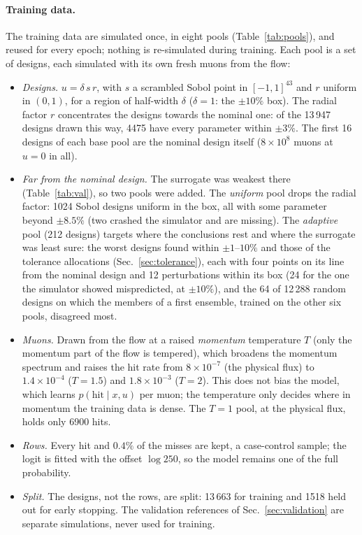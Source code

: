 \documentclass[11pt,a4paper]{article}
\begin{document}
\paragraph{Training data.}
The training data are simulated once, in eight pools (Table~\ref{tab:pools}), and reused for every
epoch; nothing is re-simulated during training. Each pool is a set of designs, each simulated
with its own fresh muons from the flow:
\begin{itemize}
  \item \emph{Designs.} $u=\delta\,s\,r$, with $s$ a scrambled Sobol point in $[-1,1]^{43}$ and
        $r$ uniform in $(0,1)$, for a region of half-width $\delta$ ($\delta=1$: the $\pm10\%$
        box). The radial factor $r$ concentrates the designs towards the nominal one: of the
        13\,947 designs drawn this way, 4475 have every parameter within $\pm3\%$. The
        first 16 designs of each base pool are the nominal design itself ($8\times10^8$ muons
        at $u=0$ in all).
  \item \emph{Far from the nominal design.} The surrogate was weakest there (Table~\ref{tab:val}),
        so two pools were added. The \emph{uniform} pool drops the radial factor: 1024 Sobol
        designs uniform in the box, all with some parameter beyond $\pm8.5\%$ (two crashed the
        simulator and are missing). The \emph{adaptive} pool (212 designs) targets where the
        conclusions rest and where the surrogate was least sure: the worst designs found within
        $\pm1$--$10\%$ and those of the tolerance allocations (Sec.~\ref{sec:tolerance}), each with
        four points on its line from the nominal design and 12 perturbations within its box (24
        for the one the simulator showed mispredicted, at $\pm10\%$), and the 64 of 12\,288 random
        designs on which the members of a first ensemble, trained on the other six pools, disagreed
        most.
  \item \emph{Muons.} Drawn from the flow at a raised \emph{momentum} temperature $T$ (only the
        momentum part of the flow is tempered), which broadens the momentum spectrum and raises
        the hit rate from $8\times10^{-7}$ (the physical flux) to $1.4\times10^{-4}$ ($T=1.5$)
        and $1.8\times10^{-3}$ ($T=2$). This does not bias the model, which learns
        $p(\text{hit}\mid x,u)$ per muon; the temperature only decides where in momentum the
        training data is dense. The $T=1$ pool, at the physical flux, holds only 6900 hits.
  \item \emph{Rows.} Every hit and $0.4\%$ of the misses are kept, a case-control sample; the
        logit is fitted with the offset $\log 250$, so the model remains one of the full
        probability.
  \item \emph{Split.} The designs, not the rows, are split: 13\,663 for training and 1518
        held out for early stopping. The validation references of Sec.~\ref{sec:validation} are
        separate simulations, never used for training.
\end{itemize}
\end{document}
